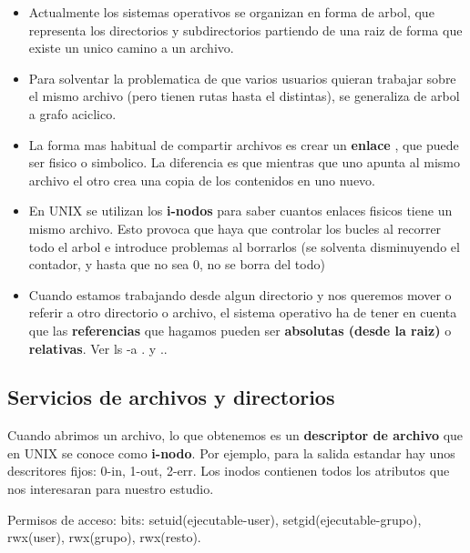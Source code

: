 \documentclass[12pt, letterpaper]{article}
\begin{document}
\begin{itemize}
	\item Actualmente los sistemas operativos se organizan en forma de arbol, que representa los directorios y subdirectorios partiendo de una raiz de forma que existe un unico camino a un archivo.
	\item Para solventar la problematica de que varios usuarios quieran trabajar sobre el mismo archivo (pero tienen rutas hasta el distintas), se generaliza de arbol a grafo aciclico.
	\item La forma mas habitual de compartir archivos es crear un \textbf{enlace} , que puede ser fisico o simbolico. La diferencia es que mientras que uno apunta al mismo archivo el otro crea una copia de los contenidos en uno nuevo.
	\item En UNIX se utilizan los \textbf{i-nodos} para saber cuantos enlaces fisicos tiene un mismo archivo. Esto provoca que haya que controlar los bucles al recorrer todo el arbol e introduce problemas al borrarlos (se solventa disminuyendo el contador, y hasta que no sea 0, no se borra del todo)
	\item Cuando estamos trabajando desde algun directorio y nos queremos mover o referir a otro directorio o archivo, el sistema operativo ha de tener en cuenta que las \textbf{referencias} que hagamos pueden ser \textbf{absolutas (desde la raiz)} o \textbf{relativas}. Ver ls -a . y ..
\end{itemize}

\subsection{Servicios de archivos y directorios}

Cuando abrimos un archivo, lo que obtenemos es un \textbf{descriptor de archivo} que en UNIX se conoce como \textbf{i-nodo}. Por ejemplo, para la salida estandar hay unos descritores fijos: 0-in, 1-out, 2-err. Los inodos contienen todos los atributos que nos interesaran para nuestro estudio.\par
Permisos de acceso: bits: setuid(ejecutable-user), setgid(ejecutable-grupo), rwx(user), rwx(grupo), rwx(resto). \par
\end{document}
